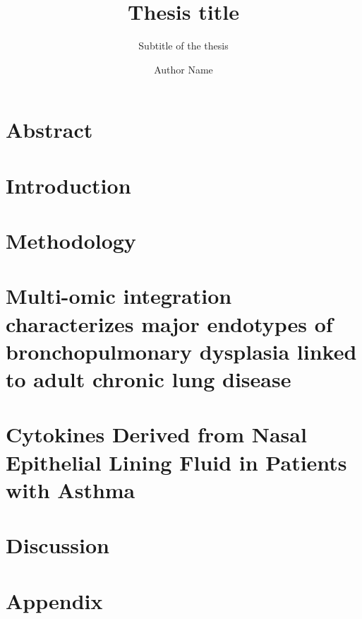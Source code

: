 \documentclass[
  a4paper,            %
  thesis=phd,         %
  english,            %
]{tumbook}
\title{Thesis title}
\subtitle{Subtitle of the thesis}
\author{Author Name}
\begin{document}
\frontmatter
\maketitle
\chapter{Abstract}

\tableofcontents

\mainmatter
\chapter{Introduction}


\chapter{Methodology}


\chapter{Multi-omic integration characterizes major endotypes of bronchopulmonary dysplasia linked to adult chronic lung disease}


\chapter{Cytokines Derived from Nasal Epithelial Lining Fluid in Patients with Asthma}


\chapter{Discussion}


\appendix
\chapter{Appendix}
\lipsum[4]

% 
\end{document}

